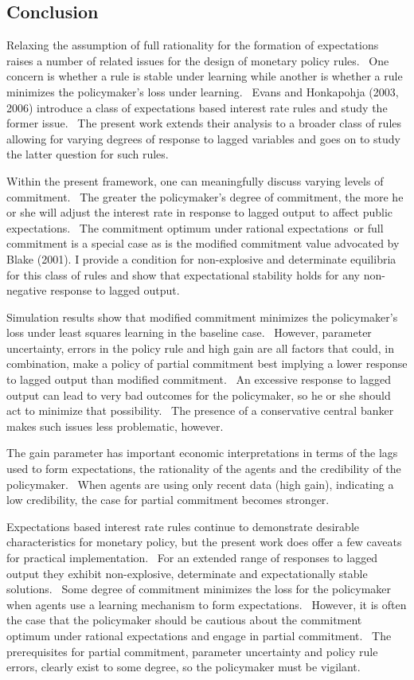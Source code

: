\documentclass{article}
\begin{document}
\begin{doublespace}
\section{Conclusion}

Relaxing the assumption of full rationality for the formation of
expectations raises a number of related issues for the design of monetary
policy rules. \ One concern is whether a rule is stable under learning while
another is whether a rule minimizes the policymaker's loss under learning. \
Evans and Honkapohja (2003, 2006) introduce a class of expectations based
interest rate rules and study the former issue. \ The present work extends
their analysis to a broader class of rules allowing for varying degrees of
response to lagged variables and goes on to study the latter question for
such rules.

Within the present framework, one can meaningfully discuss varying levels of
commitment. \ The greater the policymaker's degree of commitment, the more
he or she will adjust the interest rate in response to lagged output to
affect public expectations. \ The commitment optimum under rational
expectations\ or full commitment is a special case as is the modified
commitment value advocated by Blake (2001). I provide a condition for
non-explosive and determinate equilibria for this class of rules and show
that expectational stability holds for any non-negative response to lagged
output.

Simulation results show that modified commitment minimizes the policymaker's
loss under least squares learning in the baseline case. \ However, parameter
uncertainty, errors in the policy rule and high gain are all factors that
could, in combination, make a policy of partial commitment best implying a
lower response to lagged output than modified commitment. \ An excessive
response to lagged output can lead to very bad outcomes for the policymaker,
so he or she should act to minimize that possibility. \ The presence of a
conservative central banker makes such issues less problematic, however.

The gain parameter has important economic interpretations in terms of the
lags used to form expectations, the rationality of the agents and the
credibility of the policymaker. \ When agents are using only recent data
(high gain), indicating a low credibility, the case for partial commitment
becomes stronger.

Expectations based interest rate rules continue to demonstrate desirable
characteristics for monetary policy, but the present work does offer a few
caveats for practical implementation. \ For an extended range of responses
to lagged output they exhibit non-explosive, determinate and expectationally
stable solutions. \ Some degree of commitment minimizes the loss for the
policymaker when agents use a learning mechanism to form expectations. \
However, it is often the case that the policymaker should be cautious about
the commitment optimum under rational expectations and engage in partial
commitment. \ The prerequisites for partial commitment, parameter
uncertainty and policy rule errors, clearly exist to some degree, so the
policymaker must be vigilant.


\end{doublespace}
\end{document}
